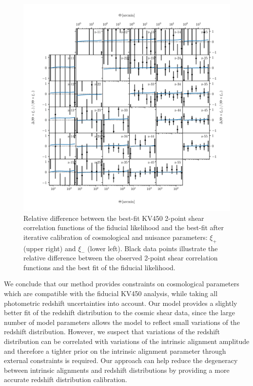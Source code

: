\documentclass{aa}
\begin{document}
\begin{figure}
\centering
\includegraphics[width=\linewidth]{plots/correlation_function.pdf}
\caption{Relative difference between the best-fit KV450 2-point shear correlation functions of the fiducial likelihood and the best-fit after iterative calibration of cosmological and nuisance parameters: $\xi_+$ (upper right) and $\xi_-$ (lower left). Black data points illustrate the relative difference between the observed 2-point shear correlation functions and the best fit of the fiducial likelihood.}
\label{fig:correlation_function}
\end{figure}

We conclude that our method provides constraints on cosmological parameters which are compatible with the fiducial KV450 analysis, while taking all photometric redshift uncertainties into account. Our model provides a slightly better fit of the redshift distribution to the cosmic shear data, since the large number of model parameters allows the model to reflect small variations of the redshift distribution. However, we suspect that variations of the redshift distribution can be correlated with variations of the intrinsic alignment amplitude and therefore a tighter prior on the intrinsic alignment parameter through external constraints is required. Our approach can help reduce the degeneracy between intrinsic alignments and redshift distributions by providing a more accurate redshift distribution calibration.
\end{document}
